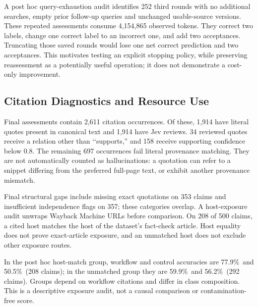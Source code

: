 \documentclass[conference]{IEEEtran}
\newcommand{\pct}{\%}
\begin{document}
A post hoc query-exhaustion audit identifies 252 third rounds with no additional searches, empty prior follow-up queries and unchanged usable-source versions. These repeated assessments consume 4,154,865 observed tokens. They correct two labels, change one correct label to an incorrect one, and add two acceptances. Truncating those saved rounds would lose one net correct prediction and two acceptances. This motivates testing an explicit stopping policy, while preserving reassessment as a potentially useful operation; it does not demonstrate a cost-only improvement.

\subsection{Citation Diagnostics and Resource Use}
Final assessments contain 2,611 citation occurrences. Of these, 1,914 have literal quotes present in canonical text and 1,914 have Jev reviews. 34 reviewed quotes receive a relation other than \lq\lq supports,'' and 158 receive supporting confidence below 0.8. The remaining 697 occurrences fail literal provenance matching. They are not automatically counted as hallucinations: a quotation can refer to a snippet differing from the preferred full-page text, or exhibit another provenance mismatch.

Final structural gaps include missing exact quotations on 353 claims and insufficient independence flags on 357; these categories overlap. A host-exposure audit unwraps Wayback Machine URLs before comparison. On 208 of 500 claims, a cited host matches the host of the dataset's fact-check article. Host equality does not prove exact-article exposure, and an unmatched host does not exclude other exposure routes.

In the post hoc host-match group, workflow and control accuracies are 77.9\pct\ and 50.5\pct\ (208 claims); in the unmatched group they are 59.9\pct\ and 56.2\pct\ (292 claims). Groups depend on workflow citations and differ in class composition. This is a descriptive exposure audit, not a causal comparison or contamination-free score.
\end{document}
